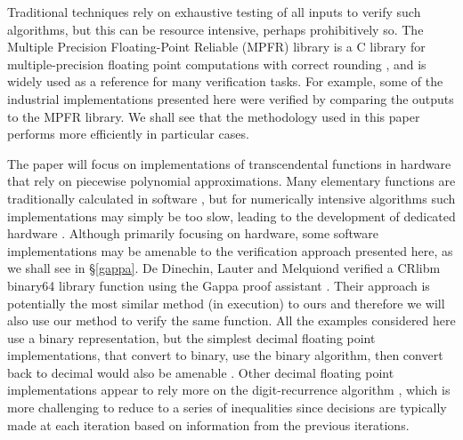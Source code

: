 \documentclass{fac}
\begin{document}
Traditional techniques rely on exhaustive testing of all inputs to verify such algorithms, but this can be resource intensive, perhaps prohibitively so. The Multiple Precision Floating-Point Reliable (MPFR) library is a C library for multiple-precision floating point computations with correct rounding \cite{fousse2007mpfr}, and is widely used as a reference for many verification tasks. For example, some of the industrial implementations presented here were verified by comparing the outputs to the MPFR library. We shall see that the methodology used in this paper performs more efficiently in particular cases. 

The paper will focus on implementations of transcendental functions in hardware that rely on piecewise polynomial approximations. Many elementary functions are traditionally calculated in software \cite{10.5555/1096483,gal1991accurate}, but for numerically intensive algorithms such implementations may simply be too slow, leading to the development of dedicated hardware \cite{tang1991table,strollo2011elementary,pineiro2004algorithm}. Although primarily focusing on hardware, some software implementations may be amenable to the verification approach presented here, as we shall see in \S\ref{gappa}. De Dinechin, Lauter and Melquiond verified a CRlibm binary64 library function using the Gappa proof assistant \cite{daramy2009cr,5483294}. Their approach is potentially the most similar method (in execution) to ours and therefore we will also use our method to verify the same function. All the examples considered here use a binary representation, but the simplest decimal floating point implementations, that convert to binary, use the binary algorithm, then convert back to decimal would also be amenable \cite{5223332}. Other decimal floating point implementations appear to rely more on the digit-recurrence algorithm \cite{5223326,5710893}, which is more challenging to reduce to a series of inequalities since decisions are typically made at each iteration based on information from the previous iterations.

\end{document}
